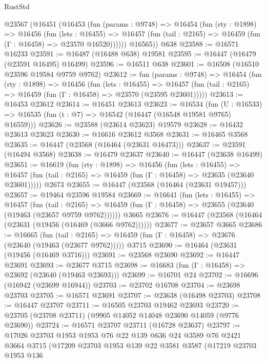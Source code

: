 \begin{lexlean}{RustStd}
\begin{coremodule}
    @23567
      (@16451
        (@16453
          (fun (params : @9748) =>
          @16454
            (fun (rty : @1898) =>
            @16456
              (fun (lets : @16455) =>
              @16457 (fun (tail : @2165) => @16459 (fun (Γ : @16458) => @23570 @16520))))))
        @16565))
    @638
@23588 := @16571 @16233
@23591 := @16487 (@16488 @638) @19581
@23595 := @16447 (@16479 (@23591 @16495) @16499)
@23596 := @16511 @638
@23601 := @16508 (@16510 @23596 @19584 @9759 @9762)
@23612 := fun (params : @9748) =>
  @16454
    (fun (rty : @1898) =>
    @16456
      (fun (lets : @16455) =>
      @16457 (fun (tail : @2165) => @16459 (fun (Γ : @16458) => @23570 (@23595 @23601)))))
@23613 := @16453 @23612
@23614 := @16451 @23613
@23623 := @16534
    (fun (U : @16533) => @16535 (fun (t : @7) => @16542 (@16447 (@16548 @19581 @9765) @16559)))
@23626 := @23588 (@23614 @23623) @19579
@23628 := @16432 @23613 @23623
@23630 := @16616 @23612 @3568
@23631 := @16465 @3568
@23635 := @16447 (@23568 (@16464 (@23631 @16473)))
@23637 := @23591 (@16494 @3568)
@23638 := @16479 @23637
@23640 := @16447 (@23638 @16499)
@23651 := @16619
    (fun (rty : @1898) =>
    @16456
      (fun (lets : @16455) =>
      @16457 (fun (tail : @2165) => @16459 (fun (Γ : @16458) => @23635 (@23640 @23601)))))
    @2673
@23655 := @16447 (@23568 (@16464 (@23631 @19457)))
@23657 := @19464 @23596 @19584
@23669 := @16641
    (fun (lets : @16455) =>
    @16457
      (fun (tail : @2165) =>
      @16459 (fun (Γ : @16458) => @23655 (@23640 (@19463 (@23657 @9759 @9762))))))
    @3665
@23676 := @16447 (@23568 (@16464 (@23631 (@19456 (@16469 (@3666 @9762))))))
@23677 := @23657 @3665
@23686 := @16665
    (fun (tail : @2165) => @16459 (fun (Γ : @16458) => @23676 (@23640 (@19463 (@23677 @9762)))))
    @3715
@23690 := @16464 (@23631 (@19456 (@16469 @3716)))
@23691 := @23568 @23690
@23692 := @16447 @23691
@23693 := @23677 @3715
@23698 := @16683 (fun (Γ : @16458) => @23692 (@23640 (@19463 @23693)))
@23699 := @16701 @24
@23702 := @16696 (@16942 (@23699 @16944))
@23703 := @23702 @16708
@23704 := @23698 @23703
@23705 := @16571 @23691
@23707 := @23638 (@16498 @23703)
@23708 := @16447 @23707
@23711 := @16505 @23703 @19462 @23693
@23720 := @23705 (@23708 @23711) (@9905 @14052 @14048 @23690 @14059 (@9776 @23690))
@23724 := @16571 @23707 @23711 (@16728 @23637)
@23797 := @17026
    @23703
    @1953
    @1953
    @76
    @22
    @139
    @636
    @24
    @3589
    @76
    @2421
    @3664
    @3715
    (@17209
      @23703
      @1953
      @139
      @22
      @3581
      @3587
      (@17219
        @23703
        @1953
        @136

\end{coremodule}
\end{lexlean}
